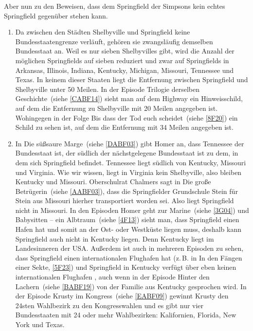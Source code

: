 \begin{appendix}
Aber nun zu den Beweisen, dass dem Springfield der Simpsons kein echtes Springfield gegenüber stehen kann.
\begin{enumerate}
	\item Da zwischen den Städten Shelbyville und Springfield keine Bundesstaatengrenze verläuft, gehören sie zwangsläufig demselben Bundesstaat an. Weil es nur sieben Shelbyvilles gibt, wird die Anzahl der möglichen Springfields auf sieben reduziert und zwar auf Springfields in Arkansas, Illinois, Indiana, Kentucky, Michigan, Missouri, Tennessee und Texas. In keinem dieser Staaten liegt die Entfernung zwischen Springfield und Shelbyville unter 50 Meilen. In der Episode \glqq Trilogie derselben Geschichte\grqq\ (siehe \ref{CABF14}) sieht man auf dem Highway ein Hinweisschild, auf dem die Entfernung zu Shelbyville mit 20 Meilen angegeben ist. Wohingegen in der Folge \glqq Bis dass der Tod euch scheidet\grqq\ (siehe \ref{8F20}) ein Schild zu sehen ist, auf dem die Entfernung mit 34 Meilen angegeben ist.
	\item In \glqq Die süßsaure Marge\grqq\ (siehe \ref{DABF03}) gibt Homer an, dass Tennessee der Bundesstaat ist, der südlich der nächstgelegene Bundesstaat ist zu dem, in dem sich Springfield befindet. Tennessee liegt südlich von Kentucky, Missouri und Virginia. Wie wir wissen, liegt in Virginia kein Shelbyville, also bleiben Kentucky und Missouri. Oberschulrat Chalmers sagt in \glqq Die große Betrügerin\grqq\ (siehe \ref{AABF03}), dass die Springfielder Grundschule Stein für Stein aus Missouri hierher transportiert worden sei. Also liegt Springfield nicht in Missouri. In den Episoden \glqq Homer geht zur Marine\grqq\ (siehe \ref{3G04}) und \glqq Babysitten -- ein Albtraum\grqq\ (siehe \ref{4F13}) sieht man, dass Springfield einen Hafen hat und somit an der Ost- oder Westküste liegen muss, deshalb kann Springfield auch nicht in Kentucky liegen. Denn Kentucky liegt im Landesinneren der USA. Außerdem ist auch in mehreren Episoden zu sehen, dass Springfield einen internationalen Flughafen hat (z.\,B. in \glqq In den Fängen einer Sekte\grqq , \ref{5F23}) und Springfield in Kentucky verfügt über eben keinen internationalen Flughafen \cite{FlughafenKentucky}, auch wenn in der Episode \glqq Hinter den Lachern\grqq\ (siehe \ref{BABF19}) von der Familie aus Kentucky gesprochen wird. In der Episode \glqq Krusty im Kongress\grqq\ (siehe \ref{EABF09}) gewinnt Krusty den 24sten Wahlbezirk zu den Kongresswahlen und es gibt nur vier Bundesstaaten mit 24 oder mehr Wahlbezirken: Kalifornien, Florida, New York und Texas.

\end{enumerate}
\end{appendix}
